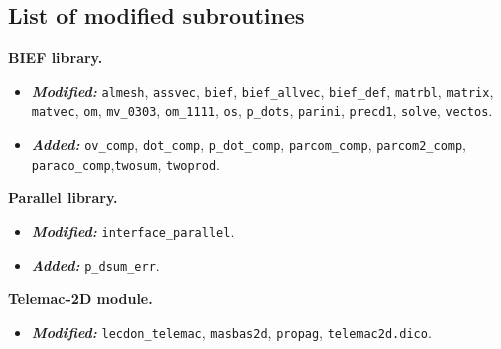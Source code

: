 \subsection*{List of modified subroutines}
\begin{description}

%
\item \textbf{BIEF library.}
\begin{itemize}
\item \textbf{\textit{Modified:}}
\texttt{almesh}, \texttt{assvec}, \texttt{bief}, \texttt{bief\_allvec}, \texttt{bief\_def}, \texttt{matrbl}, \texttt{matrix},
\texttt{matvec}, \texttt{om}, \texttt{mv\_0303}, \texttt{om\_1111}, \texttt{os}, \texttt{p\_dots}, \texttt{parini}, \texttt{precd1},
\texttt{solve}, \texttt{vectos}.
\item \textbf{\textit{Added:}}
\texttt{ov\_comp}, \texttt{dot\_comp}, \texttt{p\_dot\_comp}, \texttt{parcom\_comp}, \texttt{parcom2\_comp},
\texttt{paraco\_comp},\texttt{twosum}, \texttt{twoprod}.
\end{itemize}
%
\item \textbf{Parallel library.}
\begin{itemize}
\item \textbf{\textit{Modified:}} \texttt{interface\_parallel}.
\item \textbf{\textit{Added:}} \texttt{p\_dsum\_err}.
\end{itemize}
%
\item \textbf{Telemac-2D module.}
\begin{itemize}
\item \textbf{\textit{Modified:}}
\texttt{lecdon\_telemac}, \texttt{masbas2d}, \texttt{propag}, \texttt{telemac2d.dico}.
\end{itemize}
%
\end{description}

